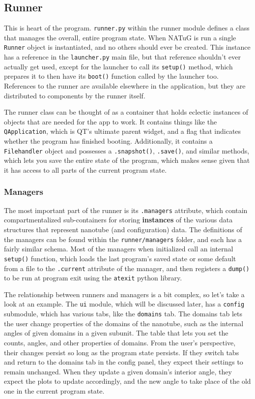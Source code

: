 \documentclass[titlepage]{article}
\begin{document}
	\subsection{Runner}
	This is heart of the program. \texttt{runner.py} within the runner module defines a class that manages the overall, entire program state. When NATuG is run a single \texttt{Runner} object is instantiated, and no others should ever be created. This instance has a reference in the \texttt{launcher.py} main file, but that reference shouldn't ever actually get used, except for the launcher to call its \texttt{setup()} method, which prepares it to then have its \texttt{boot()} function called by the launcher too. References to the runner are available elsewhere in the application, but they are distributed to components by the runner itself. 
	
	The runner class can be thought of as a container that holds eclectic instances of objects that are needed for the app to work. It contains things like the \texttt{QApplication}, which is QT's ultimate parent widget, and a flag that indicates whether the program has finished booting. Additionally, it contains a \texttt{Filehandler} object and possesses a \texttt{.snapshot()}, \texttt{.save()}, and similar methods, which lets you save the entire state of the program, which makes sense given that it has access to all parts of the current program state. 
	
	\subsubsection{Managers} \label{sect:managers}
	The most important part of the runner is its \texttt{.managers} attribute, which contain compartmentalized sub-containers for storing \textbf{instances} of the various data structures that represent nanotube (and configuration) data. The definitions of the managers can be found within the \texttt{runner/managers} folder, and each has a fairly similar schema. Most of the managers when initialized call an internal \texttt{setup()} function, which loads the last program's saved state or some default from a file to the \texttt{.current} attribute of the manager, and then registers a \texttt{dump()} to be run at program exit using the \texttt{atexit} python library. 
	
	The relationship between runners and managers is a bit complex, so let's take a look at an example. The \texttt{ui} module, which will be discussed later, has a \texttt{config} submodule, which has various tabs, like the \texttt{domains} tab. The domains tab lets the user change properties of the domains of the nanotube, such as the internal angles of given domains in a given subunit. The table that lets you set the counts, angles, and other properties of domains. From the user's perspective, their changes persist so long as the program state persists. If they switch tabs and return to the domains tab in the config panel, they expect their settings to remain unchanged. When they update a given domain's interior angle, they expect the plots to update accordingly, and the new angle to take place of the old one in the current program state.
	
\end{document}
